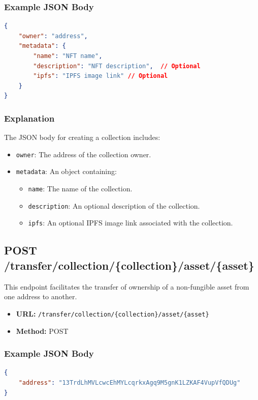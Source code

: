 \subsubsection{Example JSON Body}
\begin{lstlisting}[language=json]
{
    "owner": "address",
    "metadata": {
        "name": "NFT name",
        "description": "NFT description",  // Optional
        "ipfs": "IPFS image link" // Optional
    }
}
\end{lstlisting}

\subsubsection{Explanation}
The JSON body for creating a collection includes:
\begin{itemize}
    \item \texttt{owner}: The address of the collection owner.
    \item \texttt{metadata}: An object containing:
    \begin{itemize}
        \item \texttt{name}: The name of the collection.
        \item \texttt{description}: An optional description of the collection.
        \item \texttt{ipfs}: An optional IPFS image link associated with the collection.
    \end{itemize}
\end{itemize}

\subsection{POST /transfer/collection/\{collection\}/asset/\{asset\}}
This endpoint facilitates the transfer of ownership of a non-fungible asset from one address to another.

\begin{itemize}
    \item \textbf{URL:} \texttt{/transfer/collection/\{collection\}/asset/\{asset\}}
    \item \textbf{Method:} POST
\end{itemize}

\subsubsection{Example JSON Body}
\begin{lstlisting}[language=json]
{
    "address": "13TrdLhMVLcwcEhMYLcqrkxAgq9M5gnK1LZKAF4VupVfQDUg"
}
\end{lstlisting}

